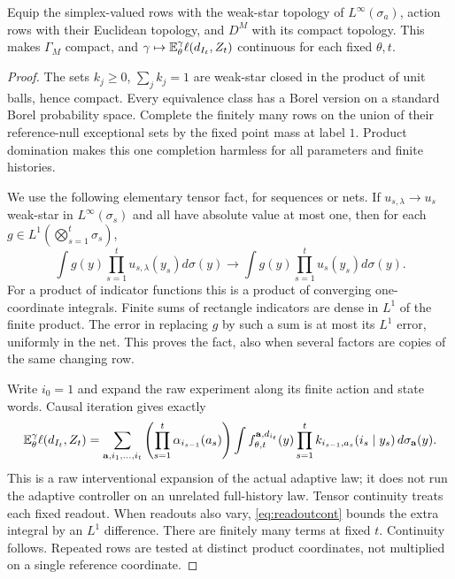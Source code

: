 \begin{proposition}\label{prop:tensor}
Equip the simplex-valued rows with the weak-star topology of $L^\infty(\sigma_a)$, action rows with their Euclidean topology, and $D^M$ with its compact topology. This makes $\Gamma_M$ compact, and $\gamma\mapsto\mathbb E_\theta^\gamma\ell(d_{I_t},Z_t)$ continuous for each fixed $\theta,t$.
\end{proposition}
\begin{proof}
The sets $k_j\ge0$, $\sum_jk_j=1$ are weak-star closed in the product of unit balls, hence compact. Every equivalence class has a Borel version on a standard Borel probability space. Complete the finitely many rows on the union of their reference-null exceptional sets by the fixed point mass at label $1$. Product domination makes this one completion harmless for all parameters and finite histories.

We use the following elementary tensor fact, for sequences or nets. If $u_{s,\lambda}\to u_s$ weak-star in $L^\infty(\sigma_s)$ and all have absolute value at most one, then for each $g\in L^1(\bigotimes_{s=1}^t\sigma_s)$,
\[
 \int g(y)\prod_{s=1}^t u_{s,\lambda}(y_s)d\sigma(y)
 \longrightarrow\int g(y)\prod_{s=1}^t u_s(y_s)d\sigma(y).
\]
For a product of indicator functions this is a product of converging one-coordinate integrals. Finite sums of rectangle indicators are dense in $L^1$ of the finite product. The error in replacing $g$ by such a sum is at most its $L^1$ error, uniformly in the net. This proves the fact, also when several factors are copies of the same changing row.

Write $i_0=1$ and expand the raw experiment along its finite action and state words. Causal iteration gives exactly
\begin{equation}\label{eq:expansion}
 \mathbb E_\theta^\gamma\ell(d_{I_t},Z_t)
 =\sum_{\mathbf a,i_1,\ldots,i_t}
 \left(\prod_{s=1}^t\alpha_{i_{s-1}}(a_s)\right)
 \int f_{\theta,t}^{\mathbf a,d_{i_t}}(y)
       \prod_{s=1}^t k_{i_{s-1},a_s}(i_s\mid y_s)\,d\sigma_{\mathbf a}(y).
\end{equation}
This is a raw interventional expansion of the actual adaptive law; it does not run the adaptive controller on an unrelated full-history law. Tensor continuity treats each fixed readout. When readouts also vary, \eqref{eq:readoutcont} bounds the extra integral by an $L^1$ difference. There are finitely many terms at fixed $t$. Continuity follows. Repeated rows are tested at distinct product coordinates, not multiplied on a single reference coordinate.
\end{proof}

